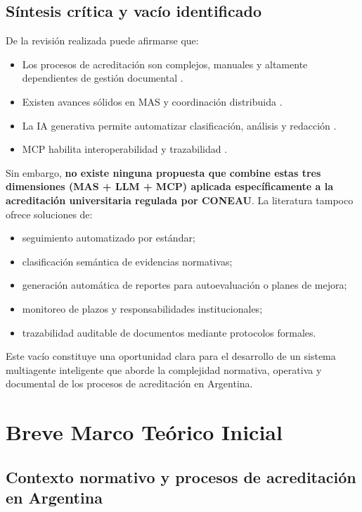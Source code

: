 \documentclass[12pt]{article}
\let\cite\citep
\begin{document}
\subsection{Síntesis crítica y vacío identificado}

De la revisión realizada puede afirmarse que:

\begin{itemize}
    \item Los procesos de acreditación son complejos, manuales y altamente dependientes de gestión documental \cite{ordenanza62,duarte2023literature}.
    \item Existen avances sólidos en MAS y coordinación distribuida \cite{perez2022breve,sakurada2021multi}.
    \item La IA generativa permite automatizar clasificación, análisis y redacción \cite{tortosasistemas,cascavita2025sistema,agashe2023llm}.
    \item MCP habilita interoperabilidad y trazabilidad \cite{ehtesham2025survey}.
\end{itemize}

Sin embargo, \textbf{no existe ninguna propuesta que combine estas tres dimensiones (MAS + LLM + MCP) aplicada específicamente a la acreditación universitaria regulada por CONEAU}.  
La literatura tampoco ofrece soluciones de:

\begin{itemize}
    \item seguimiento automatizado por estándar;
    \item clasificación semántica de evidencias normativas;
    \item generación automática de reportes para autoevaluación o planes de mejora;
    \item monitoreo de plazos y responsabilidades institucionales;
    \item trazabilidad auditable de documentos mediante protocolos formales.
\end{itemize}

Este vacío constituye una oportunidad clara para el desarrollo de un sistema multiagente inteligente que aborde la complejidad normativa, operativa y documental de los procesos de acreditación en Argentina.


\section{Breve Marco Teórico Inicial}

\subsection{Contexto normativo y procesos de acreditación en Argentina}
\end{document}
